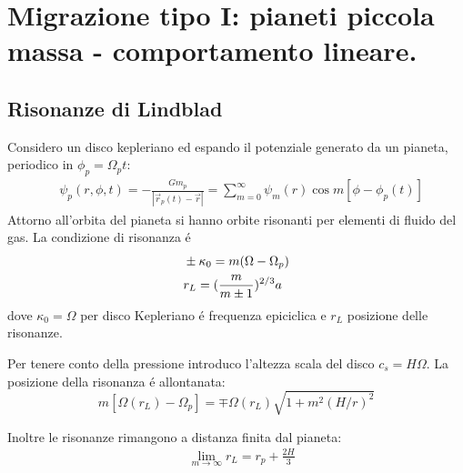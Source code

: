 \section{Migrazione tipo I: pianeti piccola massa - comportamento lineare.}

\subsection{Risonanze di Lindblad}
Considero un disco kepleriano ed espando il potenziale generato da un pianeta, periodico in $\phi_p=\Omega_pt$:
\begin{align}
&\psi_p(r,\phi,t)=-\frac{Gm_p}{|\vec{r}_p(t)-\vec{r}|}=\sum_{m=0}^{\infty}\psi_m(r)\cos{m[\phi-\phi_p(t)]}
\end{align}
Attorno all'orbita del pianeta si hanno orbite risonanti per elementi di fluido del gas. La condizione di risonanza \'e
\begin{align}
&\pm\kappa_0=m(\Omega-\Omega_p)\\
&r_L=(\frac{m}{m\pm1})^{2/3}a
\end{align}
dove $\kappa_0=\Omega$ per disco Kepleriano \'e frequenza epiciclica e $r_L$ posizione delle risonanze.


Per tenere conto della pressione introduco l'altezza scala del disco $c_s=H\Omega$. La posizione della risonanza \'e allontanata:
\begin{equation}
m[\Omega(r_L)-\Omega_p]=\mp\Omega(r_L)\sqrt{1+m^2(H/r)^2}
\end{equation}

Inoltre le risonanze rimangono a distanza finita dal pianeta:
\begin{align}
&\lim_{m\to\infty}r_L=r_p+\frac{2H}{3}
\end{align}

